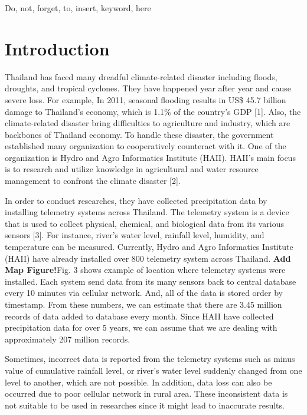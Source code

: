 \documentclass[conference]{IEEEtran}
\begin{document}
\begin{IEEEkeywords}
\color{red} Do, not, forget, to, insert, keyword, here
\end{IEEEkeywords}

\IEEEpeerreviewmaketitle

\section{Introduction}

Thailand has faced many dreadful climate-related disaster including floods, droughts, and tropical cyclones. They have happened year after year and cause severe loss. For example, In 2011, seasonal flooding results in US\$ 45.7 billion damage to Thailand’s economy, which is 1.1\% of the country’s GDP [1]. Also, the climate-related disaster bring difficulties to agriculture and industry, which are backbones of Thailand economy. To handle these disaster, the government established many organization to cooperatively counteract with it. One of the organization is Hydro and Agro Informatics Institute (HAII). HAII’s main focus is to research and utilize knowledge in agricultural and water resource management to confront the climate disaster [2].

In order to conduct researches, they have collected precipitation data by installing telemetry systems across Thailand. The telemetry system is a device that is used to collect physical, chemical, and biological data from its various sensors [3]. For instance, river’s water level, rainfall level, humidity, and temperature can be measured. Currently, Hydro and Agro Informatics Institute (HAII) have already installed over 800 telemetry system across Thailand. \textbf{\color{red}Add Map Figure!}Fig. 3 shows example of location where telemetry systems were installed. Each system send data from its many sensors back to central database every 10 minutes via cellular network. And, all of the data is stored order by timestamp. From these numbers, we can estimate that there are 3.45 million records of data added to database every month. Since HAII have collected precipitation data for over 5 years, we can assume that we are dealing with approximately 207 million records.


Sometimes, incorrect data is reported from the telemetry systems such as minus value of cumulative rainfall level, or river’s water level suddenly changed from one level to another, which are not possible. In addition, data loss can also be occurred due to poor cellular network in rural area. These inconsistent data is not suitable to be used in researches since it might lead to inaccurate results.
\end{document}
